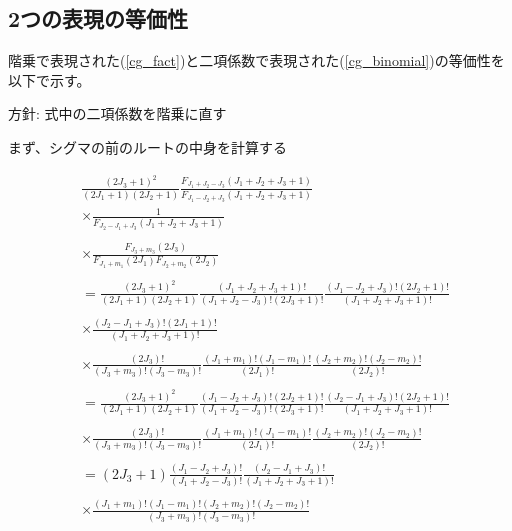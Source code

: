 \subsection{2つの表現の等価性}

階乗で表現された(\ref{cg_fact})と二項係数で表現された(\ref{cg_binomial})の等価性を以下で示す。


方針: 式中の二項係数を階乗に直す



まず、シグマの前のルートの中身を計算する

\begin{align*}
    &\frac{(2J_3 + 1)^2}{(2J_1 + 1)(2J_2 + 1)}
    \frac{F_{J_1 + J_2 - J_3}(J_1 + J_2 + J_3 + 1)}{F_{J_1 - J_2 + J_3}(J_1 + J_2 + J_3 + 1)}\\ 
    &\times \frac{1}{ F_{J_2 - J_1 + J_3}(J_1 + J_2 + J_3 + 1)} \\
    \\
    &\times \frac{F_{J_3 + m_3}(2J_3)}{F_{J_1 + m_1}(2J_1) F_{J_2 + m_2}(2J_2)} \\
    \\
    &= \frac{(2J_3 + 1)^2}{(2J_1 + 1)(2J_2 + 1)} \frac{(J_1 + J_2 + J_3 + 1)!}{(J_1 + J_2 - J_3)!(2J_3 + 1)!} 
    \frac{(J_1 - J_2 + J_3)!(2J_2 + 1)!}{(J_1 + J_2 + J_3 + 1)!} \\
    \\
    &\times \frac{(J_2 - J_1 + J_3 )!(2J_1 + 1)!}{(J_1 + J_2 + J_3 + 1)!} \\
    \\
    &\times \frac{(2J_3)!}{(J_3 + m_3)!(J_3 - m_3)!} \frac{(J_1 + m_1)!(J_1 - m_1)!}{(2J_1)!} \frac{(J_2 + m_2)!(J_2 - m_2)!}{(2J_2)!} \\
    \\
    &= \frac{(2J_3 + 1)^2}{(2J_1 + 1)(2J_2 + 1)} \frac{(J_1 - J_2 + J_3)!(2J_2 + 1)!}{(J_1 + J_2 - J_3)!(2J_3 + 1)!} 
    \frac{(J_2 - J_1 + J_3)!(2J_2 + 1)!}{(J_1 + J_2 + J_3 + 1)!} \\
    \\ 
    &\times \frac{(2J_3)!}{(J_3 + m_3)!(J_3 - m_3)!} \frac{(J_1 + m_1)!(J_1 - m_1)!}{(2J_1)!} \frac{(J_2 + m_2)!(J_2 - m_2)!}{(2J_2)!} \\
    \\
    &= (2J_3 + 1)\frac{(J_1 - J_2 + J_3)!}{(J_1 + J_2 - J_3)!} 
    \frac{(J_2 - J_1 + J_3)!}{(J_1 + J_2 + J_3 + 1)!} \\
    \\ 
    &\times \frac{(J_1 + m_1)!(J_1 - m_1)!(J_2 + m_2)!(J_2 - m_2)!}{(J_3 + m_3)!(J_3 - m_3)!}  \\
\end{align*}

